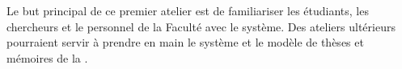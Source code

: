 \documentclass{article}
\begin{document}
\smallskip{}

Le but principal de ce premier atelier est de familiariser les étudiants, les chercheurs et le personnel de la Faculté avec le système. Des ateliers ultérieurs pourraient servir à prendre en main le système et le modèle de thèses et mémoires de la .


\end{document}
